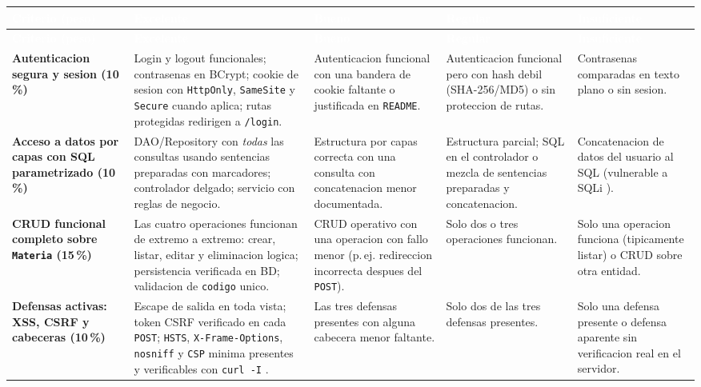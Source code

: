 \documentclass[10pt,a4paper]{article}
\begin{document}
{\footnotesize
\begin{longtable}{
    C{3.0cm}
    C{4.0cm}
    C{3.5cm}
    C{3.2cm}
    C{2.7cm}
}
\textcolor{white}{\textbf{Criterio (peso)}} &
\textcolor{white}{\textbf{Excelente}} &
\textcolor{white}{\textbf{Bueno}} &
\textcolor{white}{\textbf{Regular}} &
\textcolor{white}{\textbf{Insuficiente}} \\
\endfirsthead

\textcolor{white}{\textbf{Criterio (peso)}} &
\textcolor{white}{\textbf{Excelente}} &
\textcolor{white}{\textbf{Bueno}} &
\textcolor{white}{\textbf{Regular}} &
\textcolor{white}{\textbf{Insuficiente}} \\
\endhead

\textbf{Autenticacion segura y sesion (10\,\%)} &
Login y logout funcionales; contrasenas en BCrypt; cookie de sesion con \texttt{HttpOnly}, \texttt{SameSite} y \texttt{Secure} cuando aplica; rutas protegidas redirigen a \texttt{/login}. &
Autenticacion funcional con una bandera de cookie faltante o justificada en \texttt{README}. &
Autenticacion funcional pero con hash debil (SHA-256/MD5) o sin proteccion de rutas. &
Contrasenas comparadas en texto plano o sin sesion. \\

\textbf{Acceso a datos por capas con SQL parametrizado (10\,\%)} &
DAO/Repository con \emph{todas} las consultas usando sentencias preparadas con marcadores; controlador delgado; servicio con reglas de negocio. &
Estructura por capas correcta con una consulta con concatenacion menor documentada. &
Estructura parcial; SQL en el controlador o mezcla de sentencias preparadas y concatenacion. &
Concatenacion de datos del usuario al SQL (vulnerable a SQLi \cite{owasp2021top10}). \\

\textbf{CRUD funcional completo sobre \texttt{Materia} (15\,\%)} &
Las cuatro operaciones funcionan de extremo a extremo: crear, listar, editar y eliminacion logica; persistencia verificada en BD; validacion de \texttt{codigo} unico. &
CRUD operativo con una operacion con fallo menor (p.\,ej. redireccion incorrecta despues del \texttt{POST}). &
Solo dos o tres operaciones funcionan. &
Solo una operacion funciona (tipicamente listar) o CRUD sobre otra entidad. \\

\textbf{Defensas activas: XSS, CSRF y cabeceras (10\,\%)} &
Escape de salida en toda vista; token CSRF verificado en cada \texttt{POST}; \texttt{HSTS}, \texttt{X-Frame-Options}, \texttt{nosniff} y \texttt{CSP} minima presentes y verificables con \texttt{curl -I} \cite{owasp2021top10}. &
Las tres defensas presentes con alguna cabecera menor faltante. &
Solo dos de las tres defensas presentes. &
Solo una defensa presente o defensa aparente sin verificacion real en el servidor. \\


\end{longtable}}
\end{document}
